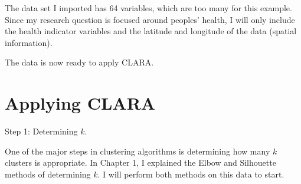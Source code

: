 \documentclass[12pt,twoside]{amherstthesis}
\begin{document}
  The data set I imported has 64 variables, which are too many for this
  example. Since my research question is focused around peoples' health, I
  will only include the health indicator variables and the latitude and
  longitude of the data (spatial information).
  
  \begin{Shaded}
  \begin{Highlighting}[]
  \StringTok{ }\NormalTok{(}\NormalTok{, }\NormalTok{, }\NormalTok{, }
              \NormalTok{, }\NormalTok{, }\NormalTok{)}
  \StringTok{ }
  \end{Highlighting}
  \end{Shaded}
  
  The data is now ready to apply CLARA.
  
  \section{Applying CLARA}\label{applying-clara}
  
  Step 1: Determining \(k\).
  
  One of the major steps in clustering algorithms is determining how many
  \(k\) clusters is appropriate. In Chapter 1, I explained the Elbow and
  Silhouette methods of determining \(k\). I will perform both methods on
  this data to start.
  
  \begin{Shaded}
  \begin{Highlighting}[]
  \StringTok{ }
  
  \StringTok{ } \NormalTok{) }\OperatorTok{+}
  \StringTok{    }\NormalTok{(} \NormalTok{, } \NormalTok{)}\OperatorTok{+}
  \StringTok{  }\NormalTok{(} 
  \end{Highlighting}
  \end{Shaded}
  
\end{document}
